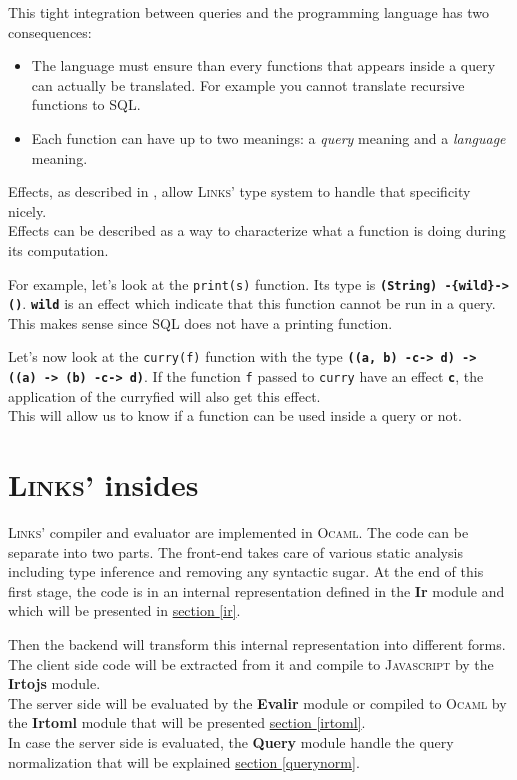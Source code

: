 \documentclass[11pt]{article}
\newcommand\mysc[1]{{\rmfamily\textsc{#1}}\xspace}
\newcommand\links{\mysc{Links}}
\newcommand\sql{\mysc{SQL}}
\newcommand\js{\mysc{Javascript}}
\newcommand\ocaml{\mysc{Ocaml}}
\newcommand\refsec[1]{\hyperref[#1]{section \ref*{#1}}}
\newcommand\sig[1]{{\tt\bf #1}}
\newcommand\code[1]{{\tt #1}}
\newcommand\effect[1]{{\em #1}}
\newcommand\module[1]{{\bf #1}}
\begin{document}
This tight integration between queries and the programming language has two consequences:
\begin{itemize}
\item The language must ensure than every functions that appears inside a query can actually be translated. For example you cannot translate recursive functions to \sql.
\item Each function can have up to two meanings: a \effect{query} meaning and a \effect{language} meaning.
\end{itemize}

Effects, as described in \cite{links:effect}, allow \links' type system to handle that specificity nicely.\\

Effects can be described as a way to characterize what a function is doing during its computation. 

For example, let's look at the \code{print(s)} function. Its type is \sig{(String) -\{wild\}-> ()}. \sig{wild} is an effect which indicate that this function cannot be run in a query. This makes sense since \sql does not have a printing function.

Let's now look at the \code{curry(f)} function with the type \sig{((a, b) -c-> d) -> ((a) -> (b) -c-> d)}. If the function \code{f} passed to \code{curry} have an effect \sig{c}, the application of the curryfied will also get this effect.\\

This will allow us to know if a function can be used inside a query or not.

\section{\links' insides}

\links' compiler and evaluator are implemented in \ocaml. 
The code can be separate into two parts. 
The front-end takes care of various static analysis including type inference and removing any syntactic sugar. 
At the end of this first stage, the code is in an internal representation defined in the \module{Ir} module and which will be presented in \refsec{ir}. 

Then the backend will transform this internal representation into different forms.\\
The client side code will be extracted from it and compile to \js by the \module{Irtojs} module.\\
The server side will be evaluated by the \module{Evalir} module or compiled to \ocaml by the \module{Irtoml} module that will be presented \refsec{irtoml}.\\
In case the server side is evaluated, the \module{Query} module handle the query normalization that will be explained \refsec{querynorm}.
\end{document}
